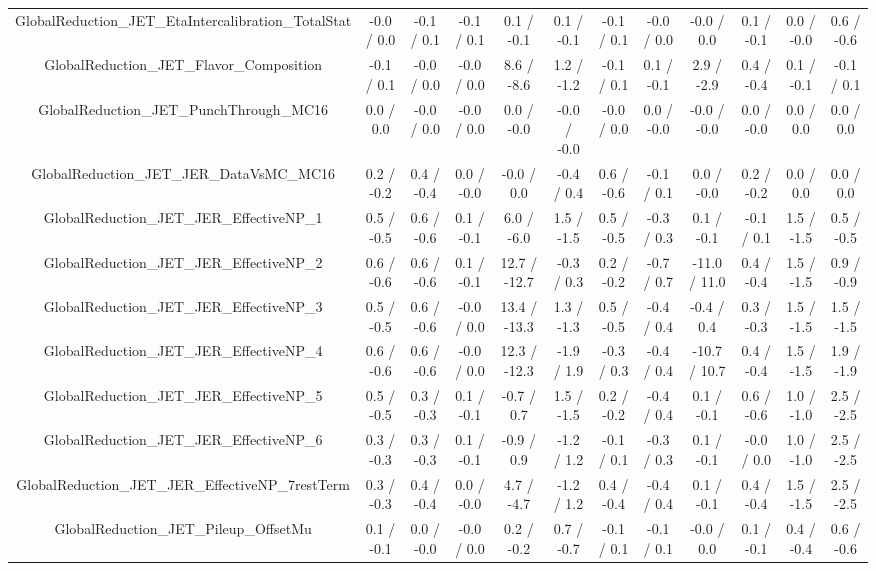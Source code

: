 \begin{table}[htbp]
\begin{center}
\begin{tabular}{|c|c|c|c|c|c|c|c|c|c|c|c|}
  GlobalReduction_JET_EtaIntercalibration_TotalStat & -0.0 / 0.0 & -0.1 / 0.1 & -0.1 / 0.1 & 0.1 / -0.1 & 0.1 / -0.1 & -0.1 / 0.1 & -0.0 / 0.0 & -0.0 / 0.0 & 0.1 / -0.1 & 0.0 / -0.0 & 0.6 / -0.6 \\ 
  GlobalReduction_JET_Flavor_Composition & -0.1 / 0.1 & -0.0 / 0.0 & -0.0 / 0.0 & 8.6 / -8.6 & 1.2 / -1.2 & -0.1 / 0.1 & 0.1 / -0.1 & 2.9 / -2.9 & 0.4 / -0.4 & 0.1 / -0.1 & -0.1 / 0.1 \\ 
  GlobalReduction_JET_PunchThrough_MC16 & 0.0 / 0.0 & -0.0 / 0.0 & -0.0 / 0.0 & 0.0 / -0.0 & -0.0 / -0.0 & -0.0 / 0.0 & 0.0 / -0.0 & -0.0 / -0.0 & 0.0 / -0.0 & 0.0 / 0.0 & 0.0 / 0.0 \\ 
  GlobalReduction_JET_JER_DataVsMC_MC16 & 0.2 / -0.2 & 0.4 / -0.4 & 0.0 / -0.0 & -0.0 / 0.0 & -0.4 / 0.4 & 0.6 / -0.6 & -0.1 / 0.1 & 0.0 / -0.0 & 0.2 / -0.2 & 0.0 / 0.0 & 0.0 / 0.0 \\ 
  GlobalReduction_JET_JER_EffectiveNP_1 & 0.5 / -0.5 & 0.6 / -0.6 & 0.1 / -0.1 & 6.0 / -6.0 & 1.5 / -1.5 & 0.5 / -0.5 & -0.3 / 0.3 & 0.1 / -0.1 & -0.1 / 0.1 & 1.5 / -1.5 & 0.5 / -0.5 \\ 
  GlobalReduction_JET_JER_EffectiveNP_2 & 0.6 / -0.6 & 0.6 / -0.6 & 0.1 / -0.1 & 12.7 / -12.7 & -0.3 / 0.3 & 0.2 / -0.2 & -0.7 / 0.7 & -11.0 / 11.0 & 0.4 / -0.4 & 1.5 / -1.5 & 0.9 / -0.9 \\ 
  GlobalReduction_JET_JER_EffectiveNP_3 & 0.5 / -0.5 & 0.6 / -0.6 & -0.0 / 0.0 & 13.4 / -13.3 & 1.3 / -1.3 & 0.5 / -0.5 & -0.4 / 0.4 & -0.4 / 0.4 & 0.3 / -0.3 & 1.5 / -1.5 & 1.5 / -1.5 \\ 
  GlobalReduction_JET_JER_EffectiveNP_4 & 0.6 / -0.6 & 0.6 / -0.6 & -0.0 / 0.0 & 12.3 / -12.3 & -1.9 / 1.9 & -0.3 / 0.3 & -0.4 / 0.4 & -10.7 / 10.7 & 0.4 / -0.4 & 1.5 / -1.5 & 1.9 / -1.9 \\ 
  GlobalReduction_JET_JER_EffectiveNP_5 & 0.5 / -0.5 & 0.3 / -0.3 & 0.1 / -0.1 & -0.7 / 0.7 & 1.5 / -1.5 & 0.2 / -0.2 & -0.4 / 0.4 & 0.1 / -0.1 & 0.6 / -0.6 & 1.0 / -1.0 & 2.5 / -2.5 \\ 
  GlobalReduction_JET_JER_EffectiveNP_6 & 0.3 / -0.3 & 0.3 / -0.3 & 0.1 / -0.1 & -0.9 / 0.9 & -1.2 / 1.2 & -0.1 / 0.1 & -0.3 / 0.3 & 0.1 / -0.1 & -0.0 / 0.0 & 1.0 / -1.0 & 2.5 / -2.5 \\ 
  GlobalReduction_JET_JER_EffectiveNP_7restTerm & 0.3 / -0.3 & 0.4 / -0.4 & 0.0 / -0.0 & 4.7 / -4.7 & -1.2 / 1.2 & 0.4 / -0.4 & -0.4 / 0.4 & 0.1 / -0.1 & 0.4 / -0.4 & 1.5 / -1.5 & 2.5 / -2.5 \\ 
  GlobalReduction_JET_Pileup_OffsetMu & 0.1 / -0.1 & 0.0 / -0.0 & -0.0 / 0.0 & 0.2 / -0.2 & 0.7 / -0.7 & -0.1 / 0.1 & -0.1 / 0.1 & -0.0 / 0.0 & 0.1 / -0.1 & 0.4 / -0.4 & 0.6 / -0.6 \\ 

\end{tabular}
\end{center}
\end{table}
